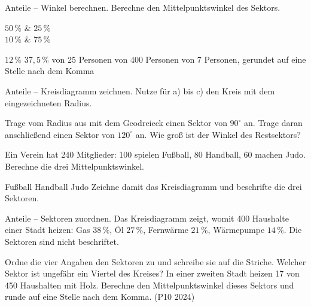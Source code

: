 \begin{aufgabe}{Anteile -- Winkel berechnen. Berechne den Mittelpunktswinkel des Sektors.}
\begin{teilezwei}
\tz $50\,\%$ \leerfeld[$^\circ$] & \tz $25\,\%$ \leerfeld[$^\circ$] \\
\tz $10\,\%$ \leerfeld[$^\circ$] & \tz $75\,\%$ \leerfeld[$^\circ$] \\
\end{teilezwei}
\begin{teile}
\teil $12\,\%$ \leerfeld[$^\circ$]
\teil $37{,}5\,\%$ \leerfeld[$^\circ$]
 von 25 Personen \leerfeld[$^\circ$]
 von 400 Personen \leerfeld[$^\circ$]
 von 7 Personen, gerundet auf eine Stelle nach dem Komma \leerfeld[$^\circ$]
\end{teile}
\end{aufgabe}

\begin{aufgabe}{Anteile -- Kreisdiagramm zeichnen. Nutze für a) bis c) den Kreis mit dem eingezeichneten Radius.}
\begin{teile}
\teil Trage vom Radius aus mit dem Geodreieck einen Sektor von $90^\circ$ an.
\teil Trage daran anschließend einen Sektor von $120^\circ$ an.
\teil Wie groß ist der Winkel des Restsektors? \leerfeld[$^\circ$]
\end{teile}

\noindent\kreisleer[2.2]

\begin{teile}
\teil Ein Verein hat 240 Mitglieder: 100 spielen Fußball, 80 Handball, 60 machen Judo. Berechne die drei Mittelpunktswinkel.
\par Fußball \leerfeld[$^\circ$] \quad Handball \leerfeld[$^\circ$] \quad Judo \leerfeld[$^\circ$]
\teil Zeichne damit das Kreisdiagramm und beschrifte die drei Sektoren.
\end{teile}

\noindent\kreisleer[2.2]
\end{aufgabe}

\begin{aufgabe}{Anteile -- Sektoren zuordnen. Das Kreisdiagramm zeigt, womit 400 Haushalte einer Stadt heizen: Gas $38\,\%$, Öl $27\,\%$, Fernwärme $21\,\%$, Wärmepumpe $14\,\%$. Die Sektoren sind nicht beschriftet.}
\noindent{}

\begin{teile}
\teil Ordne die vier Angaben den Sektoren zu und schreibe sie auf die Striche.
\teil Welcher Sektor ist ungefähr ein Viertel des Kreises? \leerfeld
\teil In einer zweiten Stadt heizen 17 von 450 Haushalten mit Holz. Berechne den Mittelpunktswinkel dieses Sektors und runde auf eine Stelle nach dem Komma. (P10 2024) \leerfeld[$^\circ$]
\end{teile}
\end{aufgabe}


